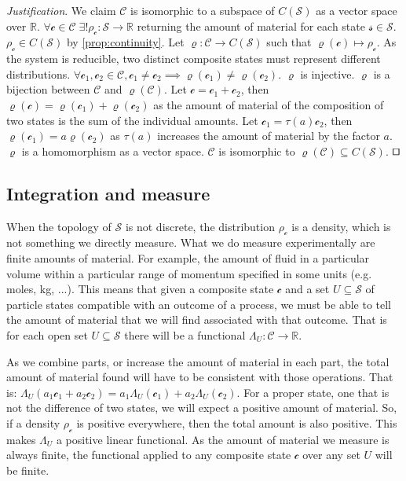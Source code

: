 \documentclass[smallextended]{svjour3}
\numberwithin{equation}{section}
\newenvironment{justification}{\emph{Justification}.}{\hfill\(\qed\)}
\begin{document}
\begin{justification}
We claim $\mathcal{C}$ is isomorphic to a subspace of $C(\mathcal{S})$ as a vector space over $\mathbb{R}$. $\forall \mathcal{c} \in \mathcal{C} \; \exists ! \rho_{\mathcal{c}}:\mathcal{S} \rightarrow \mathbb{R}$ returning the amount of material for each state $\mathcal{s} \in \mathcal{S}$. $\rho_{\mathcal{c}} \in C(\mathcal{S})$ by \ref{prop:continuity}. Let $\varrho : \mathcal{C} \rightarrow C(\mathcal{S})$ such that $\varrho(\mathcal{c}) \mapsto \rho_\mathcal{c}$. 
As the system is reducible, two distinct composite states must represent different distributions. $\forall \mathcal{c_1}, \mathcal{c_2} \in \mathcal{C}, \mathcal{c_1} \neq \mathcal{c_2} \implies \varrho(\mathcal{c_1}) \neq \varrho(\mathcal{c_2})$. $\varrho$ is injective. $\varrho$ is a bijection between $\mathcal{C}$ and $\varrho(\mathcal{C})$. Let $\mathcal{c}=\mathcal{c}_1+\mathcal{c}_2$, then $\varrho(\mathcal{c})=\varrho(\mathcal{c}_1)+\varrho(\mathcal{c}_2)$ as the amount of material of the composition of two states is the sum of the individual amounts. Let $\mathcal{c}_1=\tau(a)\mathcal{c}_2$, then $\varrho(\mathcal{c}_1)=a \varrho(\mathcal{c}_2)$ as $\tau(a)$ increases the amount of material by the factor $a$. $\varrho$ is a homomorphism as a vector space. $\mathcal{C}$ is isomorphic to $\varrho(\mathcal{C}) \subseteq C(\mathcal{S})$.
\end{justification}

\subsection{Integration and measure}

When the topology of $\mathcal{S}$ is not discrete, the distribution $\rho_\mathcal{c}$ is a density, which is not something we directly measure. What we do measure experimentally are finite amounts of material. For example, the amount of fluid in a particular volume within a particular range of momentum specified in some units (e.g. moles, kg, ...). This means that given a composite state $\mathcal{c}$ and a set $U \subseteq \mathcal{S}$ of particle states compatible with an outcome of a process, we must be able to tell the amount of material that we will find associated with that outcome. That is for each open set $U \subseteq \mathcal{S}$ there will be a functional $\Lambda_U : \mathcal{C} \rightarrow \mathbb{R}$.

As we combine parts, or increase the amount of material in each part, the total amount of material found will have to be consistent with those operations. That is: $\Lambda_U(a_1 \mathcal{c}_1 + a_2 \mathcal{c}_2) = a_1 \Lambda_U(\mathcal{c}_1) + a_2 \Lambda_U(\mathcal{c}_2)$. For a proper state, one that is not the difference of two states, we will expect a positive amount of material. So, if a density $\rho_\mathcal{c}$ is positive everywhere, then the total amount is also positive. This makes $\Lambda_U$ a positive linear functional. As the amount of material we measure is always finite, the functional applied to any composite state $\mathcal{c}$ over any set $U$ will be finite.
\end{document}
